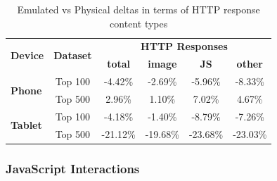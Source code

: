 \documentclass{acm_proc_article-sp}
\begin{document}
\begin{table}[htbp]
  \centering
  \caption{Emulated vs Physical deltas in terms of HTTP response content types}
    \begin{tabular}{|c|c|c|c|c|c|}
    \hline
    \multicolumn{1}{|c|}{\multirow{2}[4]{*}{\textbf{Device}}} & \multicolumn{1}{|c|}{\multirow{2}[4]{*}{\textbf{Dataset}}} & \multicolumn{4}{|c|}{\textbf{HTTP Responses}} \\ \cline{3-6}
    \multicolumn{1}{|c|}{} & \multicolumn{1}{|c|}{} & \multicolumn{1}{|c|}{\textbf{total}} & \multicolumn{1}{|c|}{\textbf{image}} & \multicolumn{1}{|c|}{\textbf{JS}} & \multicolumn{1}{|c|}{\textbf{other}} \\ \hline
    \multicolumn{1}{|l|}{\multirow{2}[4]{*}{\textbf{Phone}}} & Top 100 & -4.42\% & -2.69\% & -5.96\% & -8.33\% \\
    \multicolumn{1}{|l|}{} & Top 500 & 2.96\% & 1.10\% & 7.02\% & 4.67\% \\
    \multicolumn{1}{|l|}{\multirow{2}[4]{*}{\textbf{Tablet}}} & Top 100 & -4.18\% & -1.40\% & -8.79\% & -7.26\% \\
    \multicolumn{1}{|l|}{} & Top 500 & -21.12\% & -19.68\% & -23.68\% & -23.03\% \\ \hline
    \end{tabular}%
  \label{tab:addlabel}%
\end{table}%

\subsubsection{JavaScript Interactions}
\end{document}
